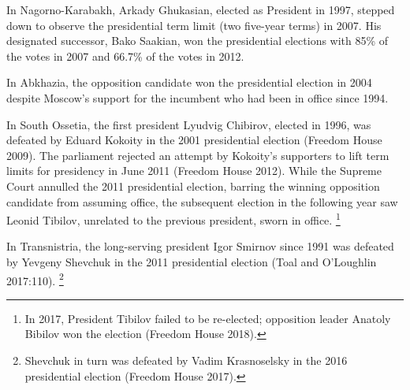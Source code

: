 \documentclass[12pt,a4paper]{article}%
\begin{document}
In Nagorno-Karabakh, Arkady Ghukasian, elected as President in 1997, stepped down to observe the presidential term limit (two five-year terms) in 2007. His designated successor, Bako Saakian, won the presidential elections with 85\% of the votes in 2007 and 66.7\% of the votes in 2012.

In Abkhazia, the opposition candidate won the presidential election in 2004 despite Moscow's support for the incumbent who had been in office since 1994. 

In South Ossetia, the first president Lyudvig Chibirov, elected in 1996, was defeated by Eduard Kokoity in the 2001 presidential election (Freedom House 2009).
The parliament rejected an attempt by Kokoity's supporters to lift term limits for presidency in June 2011 (Freedom House 2012).
While the Supreme Court annulled the 2011 presidential election, barring the winning opposition candidate from assuming office, the subsequent election in the following year saw Leonid Tibilov, unrelated to the previous president, sworn in office.%
\footnote{
	In 2017, President Tibilov failed to be re-elected; opposition leader Anatoly Bibilov won the election (Freedom House 2018).
} 

In Transnistria, the long-serving president Igor Smirnov since 1991 was defeated by Yevgeny Shevchuk in the 2011 presidential election (Toal and O'Loughlin 2017:110).%
\footnote{
	Shevchuk in turn was defeated by Vadim Krasnoselsky in the 2016 presidential election (Freedom House 2017).
	}


\end{document}
